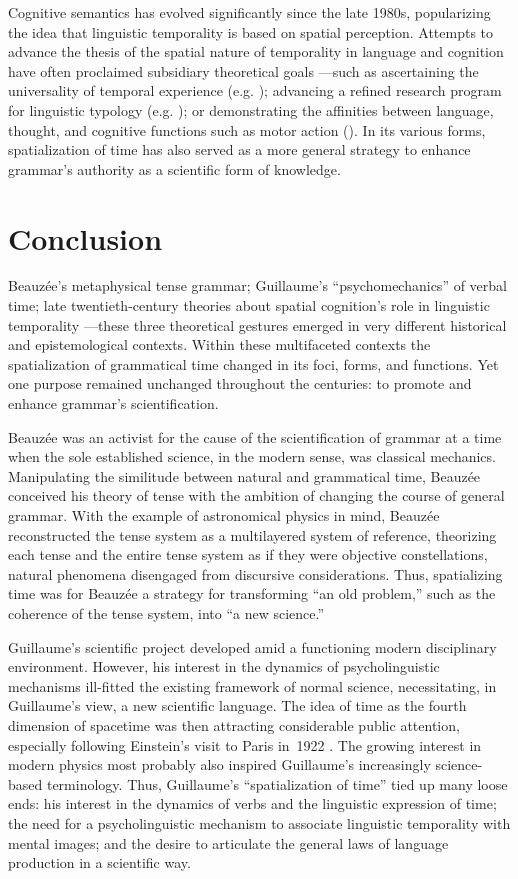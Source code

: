 \documentclass[output=paper]{langsci/langscibook}
\begin{document}
Cognitive semantics has evolved significantly since the late 1980s, popularizing the idea that linguistic temporality is based on spatial perception. Attempts to advance the thesis of the spatial nature of temporality in language and cognition have often proclaimed subsidiary theoretical goals —such as ascertaining the universality of temporal experience (e.g. \citealt{alverson_semantics_1994}); advancing a refined research program for linguistic typology (e.g. \citealt{haspelmath_space_1997}); or demonstrating the affinities between language, thought, and cognitive functions such as motor action (\citealt{casasanto_time_2008}). In its various forms, spatialization of time has also served as a more general strategy to enhance grammar’s authority as a scientific form of knowledge.

\section{Conclusion}

Beauzée’s metaphysical tense grammar; Guillaume’s “psychomechanics” of verbal time; late twentieth-century theories about spatial cognition’s role in linguistic temporality —these three theoretical gestures emerged in very different historical and epistemological contexts. Within these multifaceted contexts the spatialization of grammatical time changed in its foci, forms, and functions. Yet one purpose remained unchanged throughout the centuries: to promote and enhance grammar’s scientification. 

Beauzée was an activist for the cause of the scientification of grammar at a time when the sole established science, in the modern sense, was classical mechanics. Manipulating the similitude between natural and grammatical time, Beauzée conceived his theory of tense with the ambition of changing the course of general grammar. With the example of astronomical physics in mind, Beauzée reconstructed the tense system as a multilayered system of reference, theorizing each tense and the entire tense system as if they were objective constellations, natural phenomena disengaged from discursive considerations. Thus, spatializing time was for Beauzée a strategy for transforming “an old problem,” such as the coherence of the tense system, into “a new science.”

 Guillaume’s scientific project developed amid a functioning modern disciplinary environment. However, his interest in the dynamics of psycholinguistic mechanisms ill\nobreakdash-fitted the existing framework of normal science, necessitating, in Guillaume’s view, a new scientific language. The idea of time as the fourth dimension of spacetime was then attracting considerable public attention, especially following Einstein’s visit to Paris in~1922 \citep{glick_einsteins_1987}. The growing interest in modern physics most probably also inspired Guillaume’s increasingly science-based terminology. Thus, Guillaume’s “spatialization of time” tied up many loose ends: his interest in the dynamics of verbs and the linguistic expression of time; the need for a psycholinguistic mechanism to associate linguistic temporality with mental images; and the desire to articulate the general laws of language production in a scientific way.
\end{document}
